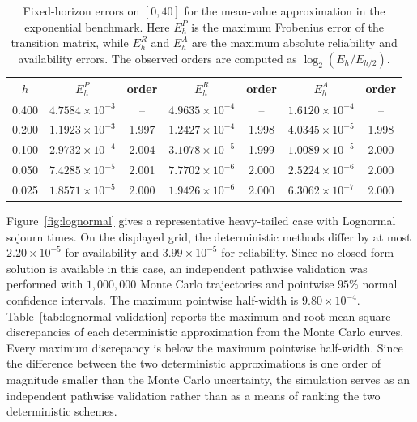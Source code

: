 \documentclass[3p,12pt,authoryear]{elsarticle}
\theoremstyle{definition}
\theoremstyle{remark}
\begin{document}
\begin{table}[H]
\centering
\small
\begin{tabular}{ccccccc}
\toprule
$h$ & $E_h^P$ & order & $E_h^R$ & order & $E_h^A$ & order\\
\midrule
0.400 & $4.7584\times10^{-3}$ & -- & $4.9635\times10^{-4}$ & -- & $1.6120\times10^{-4}$ & --\\
0.200 & $1.1923\times10^{-3}$ & 1.997 & $1.2427\times10^{-4}$ & 1.998 & $4.0345\times10^{-5}$ & 1.998\\
0.100 & $2.9732\times10^{-4}$ & 2.004 & $3.1078\times10^{-5}$ & 1.999 & $1.0089\times10^{-5}$ & 2.000\\
0.050 & $7.4285\times10^{-5}$ & 2.001 & $7.7702\times10^{-6}$ & 2.000 & $2.5224\times10^{-6}$ & 2.000\\
0.025 & $1.8571\times10^{-5}$ & 2.000 & $1.9426\times10^{-6}$ & 2.000 & $6.3062\times10^{-7}$ & 2.000\\
\bottomrule
\end{tabular}
\caption{Fixed-horizon errors on $[0,40]$ for the mean-value
approximation in the exponential benchmark. Here $E_h^P$ is the maximum Frobenius error of the transition matrix, while $E_h^R$ and $E_h^A$ are the maximum absolute reliability and availability errors. The observed orders are computed as $\log_2(E_h/E_{h/2})$.}
\label{tab:convergence}
\end{table}

Figure~\ref{fig:lognormal} gives a representative heavy-tailed case with Lognormal sojourn times. On the displayed grid, the deterministic methods differ by at most $2.20\times10^{-5}$ for availability and $3.99\times10^{-5}$ for reliability. Since no closed-form solution is available in this case, an independent pathwise validation was performed with $1{,}000{,}000$ Monte Carlo trajectories and pointwise $95\%$ normal confidence intervals. The maximum pointwise half-width is $9.80\times10^{-4}$. Table~\ref{tab:lognormal-validation} reports the maximum and root mean square discrepancies of each deterministic approximation from the Monte Carlo curves. Every maximum discrepancy is below the maximum pointwise half-width. Since the difference between the two deterministic approximations is one order of magnitude smaller than the Monte Carlo uncertainty, the simulation serves as an independent pathwise validation rather than as a means of ranking the two deterministic schemes.
\end{document}
